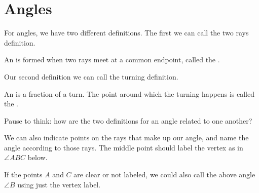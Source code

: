 \documentclass{ximera}
\begin{document}
\section{Angles}

For angles, we have two different definitions. The first we can call the two rays definition.

\begin{definition}
An   is formed when two rays meet at a common endpoint, called the .
\end{definition}

Our second definition we can call the turning definition.

\begin{definition}
An   is a fraction of a turn. The point around which the turning happens is called the .
\end{definition}

\begin{center}
\end{center}

\begin{question}
Pause to think: how are the two definitions for an angle related to one another?
\begin{freeResponse} \end{freeResponse}
\end{question}

We can also indicate points on the rays that make up our angle, and name the angle according to those rays. The middle point should label the vertex as in $\angle ABC$ below.
\begin{center}
\end{center}
If the points $A$ and $C$ are clear or not labeled, we could also call the above angle $\angle B$ using just the vertex label.
\end{document}

